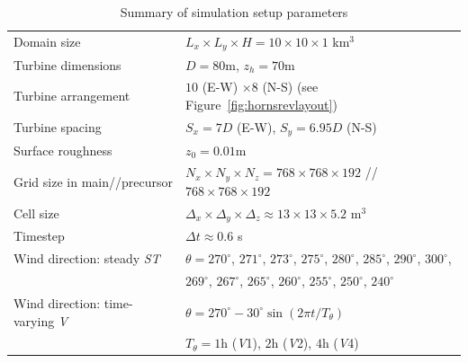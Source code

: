 		\begin{table}
			\centering
			\begin{tabularx}{\textwidth}{Xl}
				\hline
				\rule{0pt}{2.8ex}Domain size                             & $L_x \times L_y \times H = 10 \times 10 \times 1$ km$^3$ \\
				Turbine dimensions                      & $D = 80$m, $z_h = 70$m \\
				Turbine arrangement                     & $10$ (E-W) $\times 8$ (N-S) (see Figure~\ref{fig:hornsrevlayout})\\
				Turbine spacing                         & $S_x = 7D$ (E-W), $S_y = 6.95D$ (N-S) \\
				Surface roughness                         & $z_0 = 0.01$m  \\
				Grid size in main//precursor             & $N_x \times N_y \times N_z = 768 \times 768 \times 192$ // $768 \times 768 \times 192$ \\
				Cell size                                   & $\Delta_x \times \Delta_y \times \Delta_z \approx 13 \times 13 \times 5.2$ m$^3$ \\
				Timestep                                & $\Delta t \approx 0.6$ s\\
				Wind direction: steady \emph{ST}            & $\theta = 270^\circ$, $271^\circ$, $273^\circ$, $275^\circ$, $280^\circ$, $285^\circ$, $290^\circ$, $300^\circ$,  \\
				& \qquad \quad $269^\circ$, $267^\circ$, $265^\circ$, $260^\circ$, $255^\circ$, $250^\circ$, $240^\circ$\\
				Wind direction: time-varying \emph{V}      & $\theta = 270^\circ - 30^\circ\sin(2\pi t/T_\theta) $\\
				& \qquad \quad $T_\theta = 1$h (\emph{V}1), $2$h (\emph{V}2), $4$h (\emph{V}4) \\
				\hline
			\end{tabularx}
			\caption{Summary of simulation setup parameters}
			\label{tab:simulationparameters}
		\end{table}
		
		
		
		
